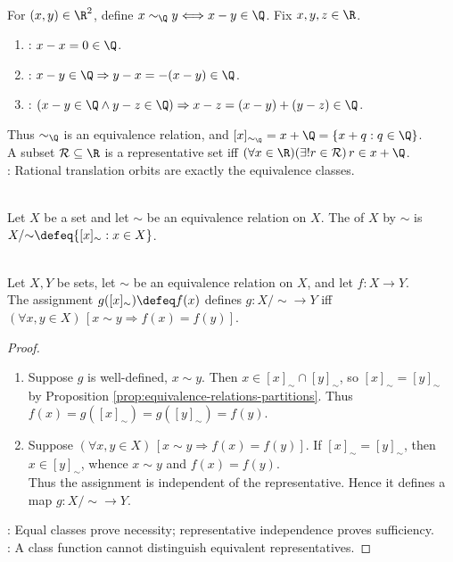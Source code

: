 \begin{example} \label{ex:rational-equivalence-classes-real-line} \\
For $(x,y)\in\R^2$, define $x\sim_{\Q}y\Longleftrightarrow x-y\in\Q$. Fix $x,y,z\in\R$.
\begin{enumerate}[label=(\roman*)]
\setlength{\itemsep}{0pt}
\item {}: $x-x=0\in\Q$.
\item {}: $x-y\in\Q\Rightarrow y-x=-(x-y)\in\Q$.
\item {}: $(x-y\in\Q\land y-z\in\Q)\Rightarrow x-z=(x-y)+(y-z)\in\Q$.
\end{enumerate}
Thus $\sim_{\Q}$ is an equivalence relation, and $[x]_{\sim_{\Q}}=x+\Q=\{x+q:q\in\Q\}$.\\
A subset $\mathcal{R}\subseteq\R$ is a representative set iff $(\forall x\in\R)(\exists! r\in\mathcal{R})\,r\in x+\Q$.\\
: Rational translation orbits are exactly the equivalence classes.
\end{example}

\begin{definition} \label{def:quotient-set-by-equivalence-relation} \\
Let $X$ be a set and let $\sim$ be an equivalence relation on $X$. The  of $X$ by $\sim$ is $X/{\sim}\defeq\{[x]_{\sim}:x\in X\}$.
\end{definition}

\begin{proposition} \label{prop:quotient-map-well-defined-by-invariance} \\
Let $X,Y$ be sets, let $\sim$ be an equivalence relation on $X$, and let $f:X\to Y$.\\
The assignment $g([x]_{\sim})\defeq f(x)$ defines $g:X/{\sim}\to Y$ iff $(\forall x,y\in X)\,[x\sim y\Rightarrow f(x)=f(y)]$.
\begin{proof}
\begin{enumerate}[label=(\roman*)]
\setlength{\itemsep}{0pt}
\item[$(\Rightarrow)$] Suppose $g$ is well-defined, $x\sim y$. Then $x\in[x]_{\sim}\cap[y]_{\sim}$, so $[x]_{\sim}=[y]_{\sim}$ by Proposition \ref{prop:equivalence-relations-partitions}. Thus $f(x)=g([x]_{\sim})=g([y]_{\sim})=f(y)$.
\item[$(\Leftarrow)$] Suppose $(\forall x,y\in X)\,[x\sim y\Rightarrow f(x)=f(y)]$. If $[x]_{\sim}=[y]_{\sim}$, then $x\in[y]_{\sim}$, whence $x\sim y$ and $f(x)=f(y)$.\\
Thus the assignment is independent of the representative. Hence it defines a map $g:X/{\sim}\to Y$.
\end{enumerate}
: Equal classes prove necessity; representative independence proves sufficiency.\\
: A class function cannot distinguish equivalent representatives.
\end{proof}
\end{proposition}
